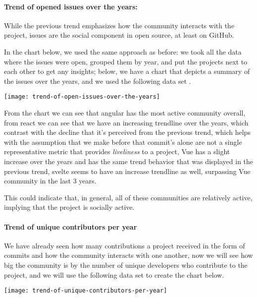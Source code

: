 \paragraph{Trend of opened issues over the years: }
While the previous trend emphasizes how the community interacts with the project, issues are the social component in open source, at least on GitHub.

In the chart below, we used the same approach as before: we took all the data where the issues were open, grouped them by year, and put the projects next to each other to get any insights; below, we have a chart that depicts a summary of the issues over the years, and we used the following data set \cite{trend-of-open-issues-over-the-years}.

\begin{center}
    \texttt{[image: trend-of-open-issues-over-the-years]}    
\end{center}

From the chart we can see that angular has the most active community overall, from react we can see that we have an increasing trendline over the years, which contrast with the decline that it's perceived from the previous trend, which helps with the assumption that we make before that commit's alone are not a single representative metric that provides \textit{liveliness} to a project, Vue has a slight increase over the years and has the same trend behavior that was displayed in the previous trend, svelte seems to have an increase trendline as well, surpassing Vue community in the last 3 years.

This could indicate that, in general, all of these communities are relatively active, implying that the project is socially active.

\paragraph{Trend of unique contributors per year}
We have already seen how many contributions a project received in the form of commits and how the community interacts with one another, now we will see how big the community is by the number of unique developers who contribute to the project, and we will use the following data set \cite{trend-of-unique-contributors-per-year} to create the chart below.

\begin{center}
    \texttt{[image: trend-of-unique-contributors-per-year]}    
\end{center}

